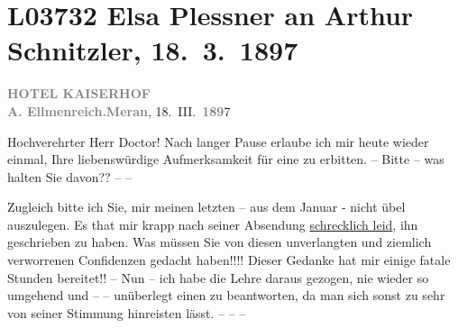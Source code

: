 

\section[Elsa Plessner an Arthur Schnitzler, 18. 3. 1897]{L03732 Elsa Plessner an Arthur Schnitzler, 18. 3. 1897}
\nopagebreak{}
\rehead{ }\normalsize\beginnumbering{}
\toendnotes[C]{\smallbreak\pagebreak[2]}
\toendnotes[C]{\smallbreak}
\pstart
           {\pb}\textcolor{gray}{\textbf{HOTEL KAISERHOF}}{\\}\textcolor{gray}{\textbf{A. Ellmenreich.}}\hfill \textcolor{gray}{\textbf{Meran}}, 18. III. \textcolor{gray}{\textbf{189}}7\pend
           
\pstart{}Hochverehrter Herr Doctor!\pend\vspace{0.5em}
\pstart
           Nach langer Pause erlaube ich mir heute wieder einmal, Ihre liebenswürdige
               Aufmerksamkeit für eine \label{K_L03732-1v}\label{K_L03732-1} zu
               erbitten. – Bitte – was halten Sie davon?? – –\pend
           
\pstart
           Zugleich bitte ich Sie, mir meinen letzten \label{K_L03732-2v}\label{K_L03732-2} – aus dem
                  Januar - nicht übel auszulegen. Es that mir krapp nach seiner
               Absendung \uline{schrecklich leid}, ihn geschrieben zu haben.
               Was müssen Sie von diesen unverlangten und ziemlich verworrenen Confidenzen gedacht
               haben!!!! Dieser Gedanke hat mir einige fatale Stunden bereitet!! – Nun – ich habe
               die Lehre daraus gezogen, nie wieder so umgehend und – – unüberlegt einen \label{K_L03732-3v}\label{K_L03732-3} zu beant{\pb}worten, da man sich sonst zu sehr von
               seiner Stimmung hinreisten lässt. – – –\pend
           
